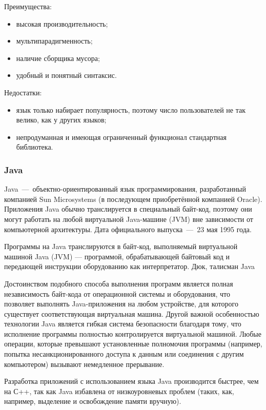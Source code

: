 Преимущества:
\begin{itemize}
	\item высокая производительность;
	\item мультипарадигменность;
	\item наличие сборщика мусора;
	\item удобный и понятный синтаксис.
\end{itemize}

Недостатки:
\begin{itemize}
	\item язык только набирает популярность, поэтому число пользователей не так велико, как у других языков;
	\item непродуманная и имеющая ограниченный функционал стандартная библиотека.~\cite{WikiD}
\end{itemize}

\subsubsection{Java}
Java~---~объектно-ориентированный язык программирования, разработанный компанией Sun Microsystems (в последующем приобретённой компанией Oracle). Приложения Java обычно транслируется в специальный байт-код, поэтому они могут работать на любой виртуальной Java-машине (JVM) вне зависимости от компьютерной архитектуры. Дата официального выпуска~---~23 мая 1995 года.

Программы на Java транслируются в байт-код, выполняемый виртуальной машиной Java (JVM) — программой, обрабатывающей байтовый код и передающей инструкции оборудованию как интерпретатор.
Дюк, талисман Java

Достоинством подобного способа выполнения программ является полная независимость байт-кода от операционной системы и оборудования, что позволяет выполнять Java-приложения на любом устройстве, для которого существует соответствующая виртуальная машина. Другой важной особенностью технологии Java является гибкая система безопасности благодаря тому, что исполнение программы полностью контролируется виртуальной машиной. Любые операции, которые превышают установленные полномочия программы (например, попытка несанкционированного доступа к данным или соединения с другим компьютером) вызывают немедленное прерывание.

Разработка приложений с использованием языка Java производится быстрее, чем на С++, так как Java избавлена от низкоуровневых проблем (таких, как, например, выделение и освобождение памяти вручную).

